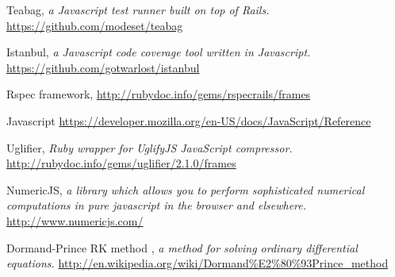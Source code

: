 \documentclass{report}
\begin{document}
\begin{thebibliography}{9}
Teabag,
\emph{ a Javascript test runner built on top of Rails.}
\href{https://github.com/modeset/teabag}{https://github.com/modeset/teabag}

Istanbul,
\emph{a Javascript code coverage tool written in Javascript.}
\href{https://github.com/gotwarlost/istanbul}{https://github.com/gotwarlost/istanbul}

Rspec framework,
\href{http://rubydoc.info/gems/rspec\-rails/frames}{http://rubydoc.info/gems/rspec\-rails/frames}

Javascript
\href{https://developer.mozilla.org/en-US/docs/JavaScript/Reference}{https://developer.mozilla.org/en-US/docs/JavaScript/Reference}

Uglifier,
\emph{Ruby wrapper for UglifyJS JavaScript compressor.}
\href{http://rubydoc.info/gems/uglifier/2.1.0/frames}{http://rubydoc.info/gems/uglifier/2.1.0/frames}

NumericJS,
\emph{a library which allows you to perform sophisticated numerical computations in pure javascript in the browser and elsewhere.}
\href{http://www.numericjs.com/}{http://www.numericjs.com/}

Dormand-Prince RK method ,
\emph{a method for solving ordinary differential equations.}
\href{http://en.wikipedia.org/wiki/Dormand\%E2\%80\%93Prince\_method}{http://en.wikipedia.org/wiki/Dormand\%E2\%80\%93Prince\_method}

\end{thebibliography}
\end{document}
